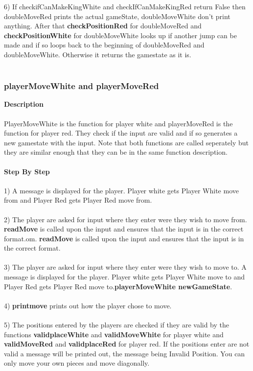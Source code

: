 \documentclass[12pt,a4paper]{article}
\begin{document}
6) If checkifCanMakeKingWhite and checkIfCanMakeKingRed return False then 
doubleMoveRed prints the actual gameState, doubleMoveWhite don't print anything. After that {\textbf{\small{checkPositionRed}}} for doubleMoveRed and {\textbf{\small{checkPositionWhite}}} for doubleMoveWhite looks up if another jump can be made and if so loops back to the beginning of doubleMoveRed and doubleMoveWhite. 
Otherwise it returns the gamestate as it is.
\\\\
{\subsubsection{playerMoveWhite and playerMoveRed}}
\textbf{Description}\\\\
PlayerMoveWhite is the function for player white and playerMoveRed is the function for player red. They check if the input are valid and if so generates a new gamestate with the input. Note that both functions are called seperately but they are similar enough that they can be in the same function description. \\\\
\textbf{Step By Step}\\\\
1) A message is displayed for the player. 
Player white gets Player White move from and Player Red gets Player Red move from. 
\\\\
2) The player are asked for input where they enter were they wish to move from. {\textbf{\small{readMove}}} is called upon the input and ensures that the input is in the correct format.om.  
{\textbf{\small{readMove}}} is called upon the input and ensures that the input is in the correct format.\\\\
3) The player are asked for input where they enter were they wish to move to. 
A message is displayed for the player. 
Player white gets Player White move to and Player Red gets Player Red move to.{\textbf{\small{playerMoveWhite newGameState}}}.\\\\
4) {\textbf{\small{printmove}}} prints out how the player chose to move.\\\\
5) The positions entered by the players are checked if they are valid by the functions {\textbf{\small{validplaceWhite}}} and {\textbf{\small{validMoveWhite}}} for player white and {\textbf{\small{validMoveRed}}} and {\textbf{\small{validplaceRed}}} for player red. If the positions enter are not valid a message will be printed out, the message being Invalid Position. You can only move your own pieces and move diagonally.\\\\
\end{document}
